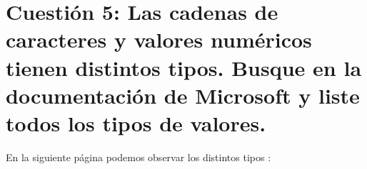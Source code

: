 	
	


\section{Cuestión 5: Las cadenas de caracteres y valores numéricos tienen distintos	tipos. Busque en la documentación de Microsoft y liste todos los tipos de valores.}

En la siguiente página podemos observar los distintos tipos \cite{registryvalues}:



